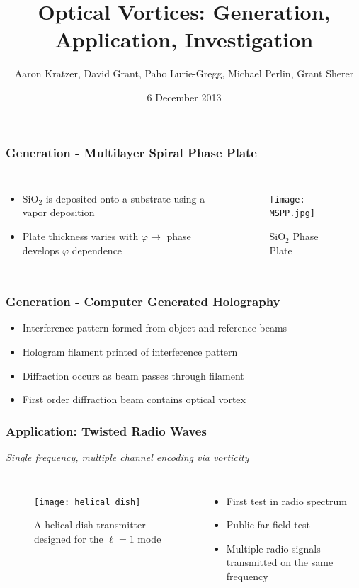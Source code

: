 \documentclass[xcolor=dvipsnames]{beamer}
\title{Optical Vortices: Generation, Application, Investigation}
\author{Aaron Kratzer, David Grant, Paho Lurie-Gregg,
  Michael Perlin, Grant Sherer}
\date{6 December 2013}
\newenvironment{items}[1][]
{\begin{itemize}
    \ifthenelse{\isempty{#1}}
    {\setlength{\itemsep}{12pt}}{\setlength{\itemsep}{#1}}}
  {\end{itemize}}
\renewcommand{\phi}{\varphi} %
\begin{document}
\begin{frame}
  \maketitle
\end{frame}

\begin{frame}
        \frametitle{Generation - Multilayer Spiral Phase Plate}
  \begin{columns}[c]
    \begin{items}
    \item SiO$_2$ is deposited onto a substrate using a vapor deposition
    \item Plate thickness varies with $\phi\to$ phase
      develops $\phi$ dependence

    \end{items}
    \begin{figure}
      \texttt{[image: MSPP.jpg]}
      \caption{SiO$_2$ Phase Plate}
      \label{MSPP}
    \end{figure}
  \end{columns}
\end{frame}

\begin{frame}
        \frametitle{Generation - Computer Generated Holography}
  \begin{items}
  \item Interference pattern formed from object and reference beams
  \item Hologram filament printed of interference pattern
  \item Diffraction occurs as beam passes through filament
  \item First order diffraction beam contains optical vortex
  \end{items}
\end{frame}

\begin{frame}
        \frametitle{Application: Twisted Radio Waves}
        \begin{center}
                \emph{Single frequency, multiple channel encoding via vorticity}
        \end{center}
  \begin{columns}[c]
    \begin{figure}
      \texttt{[image: helical\_dish]}
      \caption{A helical dish transmitter designed for the $\ell=1$
        mode}
      \label{pic:dish}
    \end{figure}
                \begin{items}
                \item First test in radio spectrum
                \item Public far field test
                \item Multiple radio signals transmitted on the same frequency
                \end{items}
        \end{columns}
\end{frame}
\end{document}
